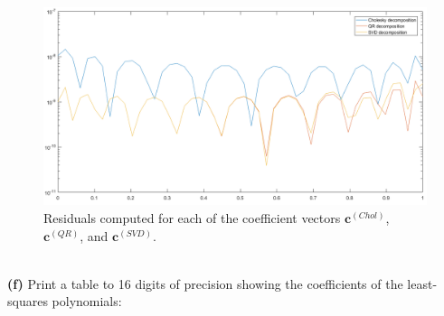\documentclass[a4paper,11pt]{article}
\begin{document}
\begin{figure}[!htb]
	\centering
	\includegraphics[width=1\textwidth]{residuals.png}
	\caption{\small Residuals computed for each of the coefficient vectors $\mathbf{c}^{(Chol)}$, $\mathbf{c}^{(QR)}$, and $\mathbf{c}^{(SVD)}$.}
\end{figure}
\noindent
\\\textbf{(f)} Print a table to 16 digits of precision showing the coefficients of the least-squares polynomials:
\end{document}
